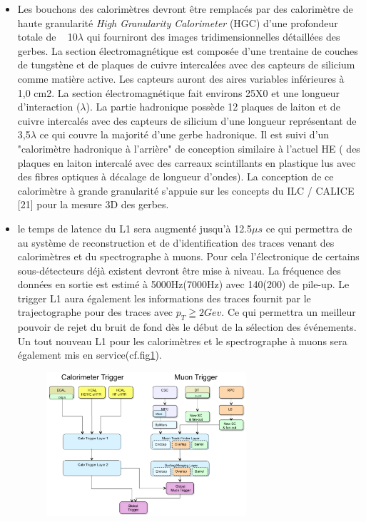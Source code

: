 \begin{itemize}[label=$\bullet$]
	\item Les bouchons des calorimètres devront être remplacés par des calorimètre de haute granularité \textit{High Granularity Calorimeter} (HGC) d'une profondeur totale de ~ 10$\lambda$ qui fourniront des images tridimensionnelles détaillées des gerbes. La section électromagnétique est composée d'une trentaine de couches de tungstène et de plaques de cuivre intercalées avec des capteurs de silicium comme matière active. Les capteurs auront des aires variables inférieures à ~ 1,0 cm2. La section électromagnétique fait environs 25X0 et une longueur d'interaction ($\lambda$). La partie hadronique possède 12 plaques de laiton et de cuivre intercalés avec des capteurs de silicium d'une longueur représentant de 3,5$\lambda$ ce qui couvre la majorité d'une gerbe hadronique. Il est suivi d'un "calorimètre hadronique à l'arrière" de conception similaire à l'actuel HE ( des plaques en laiton intercalé avec des carreaux scintillants en plastique lus avec des fibres optiques à décalage de longueur d'ondes). La conception de ce calorimètre à grande granularité s'appuie sur les concepts du ILC / CALICE [21] pour la mesure 3D des gerbes.
	\item le temps de latence du L1 sera augmenté jusqu'à 12.5$\mu s$ ce qui permettra de au système de reconstruction et de d'identification des traces venant des calorimètres et du spectrographe à muons. Pour cela l'électronique de certains sous-détecteurs déjà existent devront être mise à niveau. La fréquence des données en sortie est estimé à 5000Hz(7000Hz) avec 140(200) de pile-up. Le trigger L1 aura également les informations des traces fournit par le trajectographe pour des traces avec $p_{T}\geqq2	Gev$. Ce qui permettra un meilleur pouvoir de rejet du bruit de fond dès le début de la sélection des événements. Un tout nouveau L1 pour les calorimètres et le spectrographe à muons sera également mis en service(cf.fig\ref{L1_2}).
	\begin{figure}[ht!]
		\centering
		\includegraphics[width=0.70\textwidth]{CMS/L1_2.png}
		\label{L1_2}
	\end{figure}
\end{itemize}
